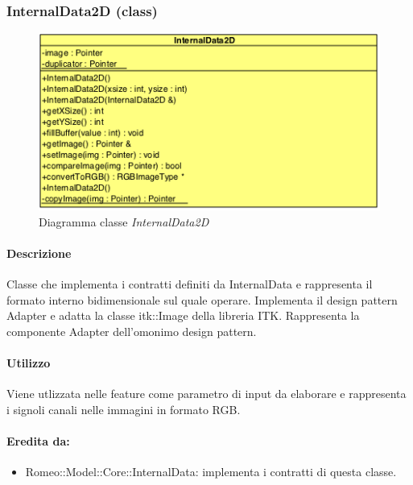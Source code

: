 \subsubsection{InternalData2D (class)}
\label{InternalData2D}
\begin{figure}[!h]
\centering
			\includegraphics[scale=1]{./Content/Immagini/modelCore/InternalData2D.png}
			\caption{Diagramma classe \textsl{InternalData2D}}
			\label{InternalData2D_img}
\end{figure}

\paragraph{Descrizione\\}
Classe che implementa i contratti definiti da InternalData e rappresenta il formato interno bidimensionale sul quale operare. Implementa il design pattern Adapter e adatta la classe itk::Image della libreria ITK\g{}. Rappresenta la componente Adapter dell'omonimo design pattern\g{}.

\paragraph{Utilizzo \\}
Viene utlizzata nelle feature\g{} come parametro di input da elaborare e rappresenta i signoli canali nelle immagini in formato RGB.

\paragraph{Eredita da:}
	\begin{itemize}
		\item Romeo::Model::Core::InternalData: implementa i contratti di questa classe.
	\end{itemize}

